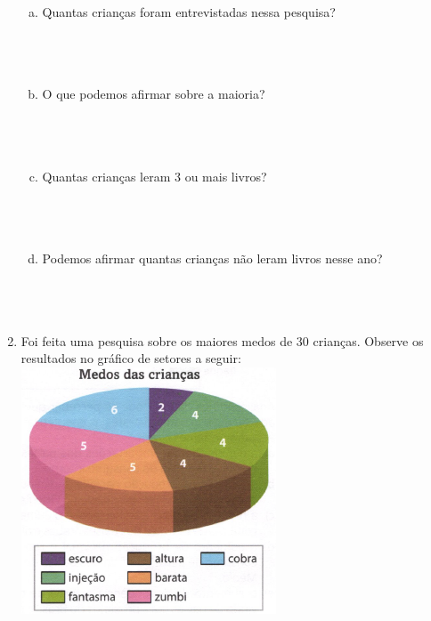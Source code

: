 \documentclass[a4paper,14pt]{article}
\begin{document}
\begin{multicols}{2}
\begin{enumerate}
			\begin{enumerate}[a)]
				\item Quantas crianças foram entrevistadas nessa pesquisa? \\\\\\\\
				\item O que podemos afirmar sobre a maioria? \\\\\\\\
				\item Quantas crianças leram 3 ou mais livros? \\\\\\\\
				\item Podemos afirmar quantas crianças não leram livros nesse ano? \\\\\\\\
			\end{enumerate}
			\item Foi feita uma pesquisa sobre os maiores medos de 30 crianças. Observe os resultados no gráfico de setores a seguir: 
			\\
			\includegraphics[width=1\linewidth]{6FMA119_imagens/imagem8}

\end{enumerate}
\end{multicols}
\end{document}
